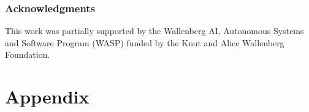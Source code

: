 \documentclass[runningheads]{llncs}
\begin{document}
\subsubsection*{Acknowledgments} This work was partially supported by
the Wallenberg AI, Autonomous Systems and Software Program (WASP) funded by
the Knut and Alice Wallenberg Foundation.
%





\appendix
\section*{Appendix}


\end{document}
